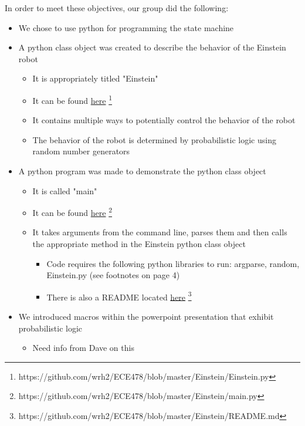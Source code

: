 \documentclass[12pt]{article}
\begin{document}
\begin{description}
		In order to meet these objectives, our group did the following:
		\begin{itemize}
			\item We chose to use python for programming the state machine
			\item A python class object was created to describe the behavior of the Einstein robot
				\begin{itemize}
					\item It is appropriately titled "Einstein"
					\item It can be found \href{https://github.com/wrh2/ECE478/blob/master/Einstein/Einstein.py}{here} \footnote{https://github.com/wrh2/ECE478/blob/master/Einstein/Einstein.py}
					\item It contains multiple ways to potentially control the behavior of the robot
					\item The behavior of the robot is determined by probabilistic logic using random number generators
				\end{itemize}
			\newpage
			\item A python program was made to demonstrate the python class object
				\begin{itemize}
					\item It is called "main"
					\item It can be found \href{https://github.com/wrh2/ECE478/blob/master/Einstein/main.py}{here} \footnote{https://github.com/wrh2/ECE478/blob/master/Einstein/main.py}
					\item It takes arguments from the command line, parses them and then calls the appropriate method in the Einstein python class object
						\begin{itemize}
							\item Code requires the following python libraries to run: argparse, random, Einstein.py (see footnotes on page 4)
							\item There is also a README located \href{https://github.com/wrh2/ECE478/blob/master/Einstein/README.md}{here} \footnote{https://github.com/wrh2/ECE478/blob/master/Einstein/README.md}
						\end{itemize}
				\end{itemize}
			\item We introduced macros within the powerpoint presentation that exhibit probabilistic logic
				\begin{itemize}
					\item Need info from Dave on this
				\end{itemize}

\end{itemize}
\end{description}
\end{document}
